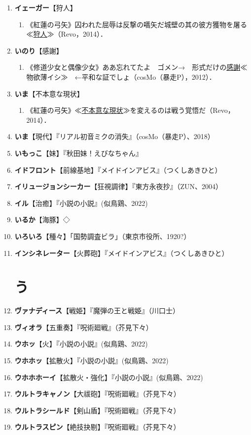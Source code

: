 \documentclass[twocolumn]{jsbook}
\newcommand{\exsentence}[3]{\item 《#1》#2（#3）．}
\newcommand{\exlist}[1]{
\begin{enumerate}[label= \raise0.2ex\hbox{\textcircled{\scriptsize{\arabic*}}}]
        #1
\end{enumerate}
}
\newcommand{\NoLabSectionTable}[1]{
    \section*{#1}
    \addcontentsline{toc}{section}{#1}
}
\begin{document}
\begin{enumerate}
    \item \textbf{イェーガー}【狩人】
    \exlist{
        \exsentence{紅蓮の弓矢}{囚われた屈辱は反撃の嚆矢だ城壁の其の彼方獲物を屠る≪\uline{狩人}≫}{Revo，2014}
    }
    \item \textbf{いのり}【感謝】
    \exlist{
        \exsentence{修道少女と偶像少女}{ああ忘れてたよ　ゴメン→　形式だけの\uline{感謝}≪物欲薄イシ≫　←平和な証でしょ}{cosMo（暴走P），2012}
    }
    \item \textbf{いま}【不本意な現状】
    \exlist{
        \exsentence{紅蓮の弓矢}{≪\uline{不本意な現状}≫を変えるのは戦う覚悟だ}{Revo，2014}
    }
    \item \textbf{いま}【現代】『リアル初音ミクの消失』（cosMo（暴走P）、2018）
    \item \textbf{いもっこ}【妹】『秋田妹！えびなちゃん』
    \item \textbf{イドフロント}【前線基地】『メイドインアビス』（つくしあきひと）
    \item \textbf{イリュージョンシーカー}【狂視調律】『東方永夜抄』（ZUN、2004）
    \item \textbf{イル}【治癒】『小説の小説』(似鳥鶏、2022)
    \item \textbf{いるか}【海豚】◇
    \item \textbf{いろいろ}【種々】「国勢調査ビラ」（東京市役所、1920?）
    \item \textbf{インシネレーター}【火葬砲】『メイドインアビス』（つくしあきひと）

\NoLabSectionTable{う}

    \item \textbf{ヴァナディース}【戦姫】『魔弾の王と戦姫』（川口士）
    \item \textbf{ヴィオラ}【五重奏】『呪術廻戦』（芥見下々）
    \item \textbf{ウホッ}【火】『小説の小説』(似鳥鶏、2022)
    \item \textbf{ウホホッ}【拡散火】『小説の小説』(似鳥鶏、2022)
    \item \textbf{ウホホホーイ}【拡散火・強化】『小説の小説』(似鳥鶏、2022)
    \item \textbf{ウルトラキャノン}【大祓砲】『呪術廻戦』（芥見下々）
    \item \textbf{ウルトラシールド}【剣山盾】『呪術廻戦』（芥見下々）
    \item \textbf{ウルトラスピン}【絶技抉剔】『呪術廻戦』（芥見下々）


\end{enumerate}
\end{document}
